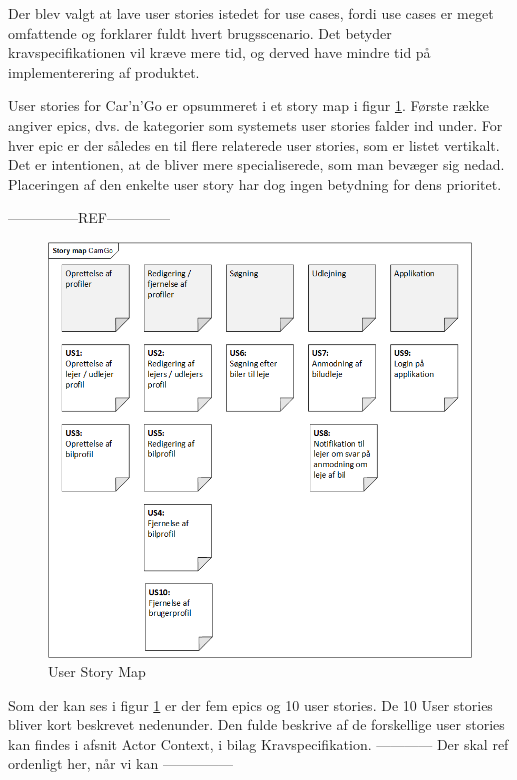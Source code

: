 \documentclass[Rapport/Rapport_main.tex]{subfiles}
\begin{document}
Der blev valgt at lave user stories istedet for use cases, fordi use cases er meget omfattende og forklarer fuldt hvert brugsscenario. Det betyder kravspecifikationen vil kræve mere tid, og derved have mindre tid på implementerering af produktet.       

User stories for Car'n'Go er opsummeret i et story map i figur \ref{fig:Story_map}. Første række angiver epics, dvs. de kategorier som systemets user stories falder ind under. For hver epic er der således en til flere relaterede user stories, som er listet vertikalt. Det er intentionen, at de bliver mere specialiserede, som man bevæger sig nedad. Placeringen af den enkelte user story har dog ingen betydning for dens prioritet.

---------------REF--------------

\begin{figure}[H]
    \centering
    \includegraphics{Kravspecifikation/Funktionelle_krav/UserStories/graphics/Story_map.png}
    \caption{User Story Map}
    \label{fig:Story_map}
\end{figure}

Som der kan ses i figur \ref{fig:Story_map} er der fem epics og 10 user stories. De 10 User stories bliver kort beskrevet nedenunder. Den fulde beskrive af de forskellige user stories kan findes i afsnit Actor Context, i bilag Kravspecifikation.
 ------------ Der skal ref ordenligt her, når vi kan ---------------
\end{document}
